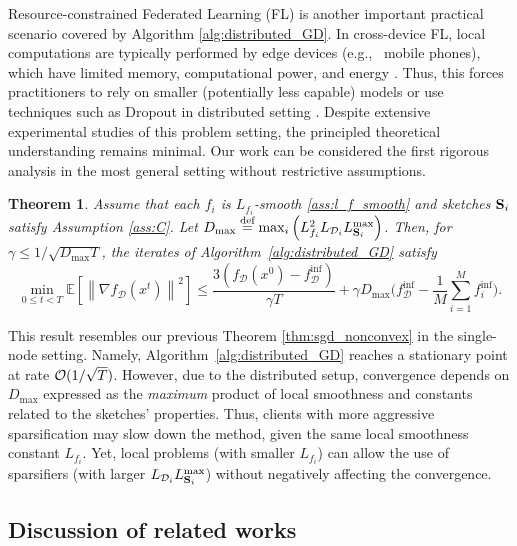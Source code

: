 \documentclass{article}
\newcommand\br[1]{\left ( #1 \right )}
\newcommand{\bb}{\mathbb}
\newcommand{\cD}{\mathcal{D}}
\newcommand{\cO}{{\cal O}}
\newcommand{\eqdef}{\stackrel{\text{def}}{=}}
\newcommand{\Exp}[1]{{\bb E}\left[#1\right]}
\newtheorem{theorem}{Theorem}
\theoremstyle{plain}
\newcommand{\tf}{f_{\mathcal{D}}}
\newcommand{\mS}{{\bf S}}
\theoremstyle{plain}
\theoremstyle{definition}
\theoremstyle{remark}
\begin{document}
Resource-constrained Federated Learning (FL) \citep{kairouz2021advances, konecny2017federated, mcmahan2017communication} is another important practical scenario covered by Algorithm \ref{alg:distributed_GD}. In cross-device FL, local computations are typically performed by edge devices (e.g., \, mobile phones), which have limited memory, computational power, and energy \citep{caldas2018expanding}. Thus, this forces practitioners to rely on smaller (potentially less capable) models or use techniques such as Dropout in distributed setting \citep{alam2022fedrolex, bouacida2021adaptive, charles2022federated, chen2022fedobd, diao2020heterofl, horvath2021fjord, jiang2022model, qiu2022zerofl, wen2022federated, yang2022partial, dun2023efficient}. Despite extensive experimental studies of this problem setting, the principled theoretical understanding remains minimal. Our work can be considered the first rigorous analysis in the most general setting without restrictive assumptions.
\begin{theorem} \label{thm:distributed_ncvx}
	Assume that each $f_i$ is $L_{f_i}$-smooth \eqref{ass:l_f_smooth} and sketches $\mS_i$ satisfy Assumption \ref{ass:C}. Let $D_{\max} \eqdef \max_i \br{L_{f_i}^2 L_{\cD_i} L_{\mS_i}^{\max}}$.
	Then, for $\gamma \leq 1 / \sqrt{D_{\mathrm{\max}} T}$, the iterates of Algorithm~\ref{alg:distributed_GD} satisfy
	\begin{equation*}
			\min_{0 \leq t < T} \Exp{\left\|\nabla \tf(x^t)\right\|^2} \leq
			\frac{3 \br{\tf(x^0) - \tf^{\inf}}}{\gamma T} + \gamma D_{\max} \biggl(\tf^{\inf} - \frac{1}{M} \sum_{i=1}^{M} f^{\inf}_i \biggr).
	\end{equation*}
\end{theorem}

This result resembles our previous Theorem \ref{thm:sgd_nonconvex} in the single-node setting. Namely, Algorithm~\ref{alg:distributed_GD}
reaches a stationary point at rate $\cO(1/\sqrt{T})$. However, due to the distributed setup, convergence depends on $D_{\max}$ expressed as the \textit{maximum} product of local smoothness and constants related to the sketches' properties. Thus, clients with more aggressive sparsification may slow down the method, given the same local smoothness constant $L_{f_i}$. Yet,  local problems (with smaller $L_{f_i}$) can allow the use of  sparsifiers (with larger $L_{\cD_i} L_{\mS_i}^{\max}$) without negatively affecting the convergence.


\subsection{Discussion of related works}
\end{document}
